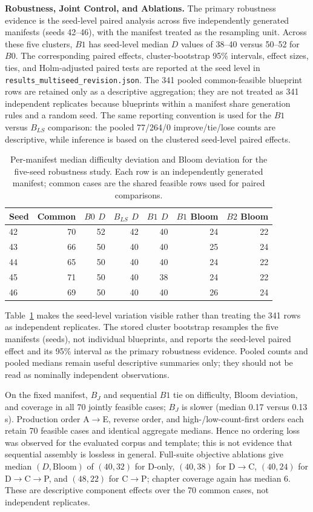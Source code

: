 \documentclass[runningheads]{llncs}
\begin{document}
\noindent\textbf{Robustness, Joint Control, and Ablations.} The primary robustness evidence is the seed-level paired analysis across five independently generated manifests (seeds 42--46), with the manifest treated as the resampling unit. Across these five clusters, $B1$ has seed-level median $D$ values of 38--40 versus 50--52 for $B0$. The corresponding paired effects, cluster-bootstrap 95\% intervals, effect sizes, ties, and Holm-adjusted paired tests are reported at the seed level in \texttt{results\_multiseed\_revision.json}. The 341 pooled common-feasible blueprint rows are retained only as a descriptive aggregation; they are not treated as 341 independent replicates because blueprints within a manifest share generation rules and a random seed. The same reporting convention is used for the $B1$ versus $B_{LS}$ comparison: the pooled 77/264/0 improve/tie/lose counts are descriptive, while inference is based on the clustered seed-level paired effects.

\begin{table}[t]
\caption{Per-manifest median difficulty deviation and Bloom deviation for the five-seed robustness study. Each row is an independently generated manifest; common cases are the shared feasible rows used for paired comparisons.}
\label{tab:seedresults}
\centering\scriptsize
\begin{tabular}{lrrrrrr}
\toprule
Seed & Common & $B0$ $D$ & $B_{LS}$ $D$ & $B1$ $D$ & $B1$ Bloom & $B2$ Bloom\\
\midrule
42 & 70 & 52 & 42 & 40 & 24 & 22\\
43 & 66 & 50 & 40 & 40 & 25 & 24\\
44 & 65 & 50 & 40 & 40 & 24 & 22\\
45 & 71 & 50 & 40 & 38 & 24 & 22\\
46 & 69 & 50 & 40 & 40 & 26 & 24\\
\bottomrule
\end{tabular}
\end{table}

Table~\ref{tab:seedresults} makes the seed-level variation visible rather than treating the 341 rows as independent replicates. The stored cluster bootstrap resamples the five manifests (seeds), not individual blueprints, and reports the seed-level paired effect and its 95\% interval as the primary robustness evidence. Pooled counts and pooled medians remain useful descriptive summaries only; they should not be read as nominally independent observations.

On the fixed manifest, $B_J$ and sequential $B1$ tie on difficulty, Bloom deviation, and coverage in all 70 jointly feasible cases; $B_J$ is slower (median 0.17 versus 0.13\,s). Production order A$\to$E, reverse order, and high-/low-count-first orders each retain 70 feasible cases and identical aggregate medians. Hence no ordering loss was observed for the evaluated corpus and template; this is not evidence that sequential assembly is lossless in general. Full-suite objective ablations give median $(D,\mathrm{Bloom})$ of $(40,32)$ for D-only, $(40,38)$ for D$\to$C, $(40,24)$ for D$\to$C$\to$P, and $(48,22)$ for C$\to$P; chapter coverage again has median 6. These are descriptive component effects over the 70 common cases, not independent replicates.
\end{document}
